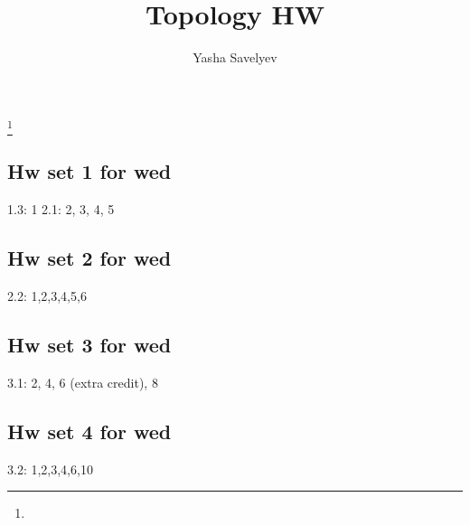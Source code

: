 \documentclass{amsart}
\numberwithin{equation}{section}
\theoremstyle{definition}
\theoremstyle{remark}
\begin{document}
\title{Topology HW}
\author{Yasha Savelyev}
\thanks {}
\maketitle
\subsection{Hw set 1 for wed}
1.3: 1  
2.1: 2, 3, 4, 5  
\subsection{Hw set 2 for wed}
2.2: 1,2,3,4,5,6
\subsection{Hw set 3 for wed}
3.1: 2, 4, 6 (extra credit), 8
\subsection{Hw set 4 for wed}
3.2: 1,2,3,4,6,10  
\end{document}
